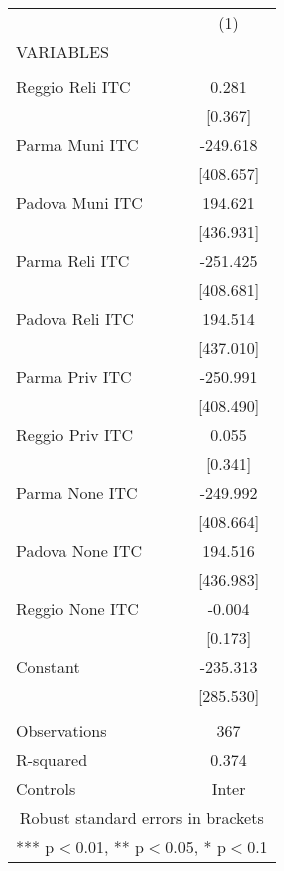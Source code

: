 \begin{tabular}{lc} \hline
 & (1) \\
VARIABLES &  \\ \hline
 &  \\
Reggio Reli ITC & 0.281 \\
 & [0.367] \\
Parma Muni ITC & -249.618 \\
 & [408.657] \\
Padova Muni ITC & 194.621 \\
 & [436.931] \\
Parma Reli ITC & -251.425 \\
 & [408.681] \\
Padova Reli ITC & 194.514 \\
 & [437.010] \\
Parma Priv ITC & -250.991 \\
 & [408.490] \\
Reggio Priv ITC & 0.055 \\
 & [0.341] \\
Parma None ITC & -249.992 \\
 & [408.664] \\
Padova None ITC & 194.516 \\
 & [436.983] \\
Reggio None ITC & -0.004 \\
 & [0.173] \\
Constant & -235.313 \\
 & [285.530] \\
 &  \\
Observations & 367 \\
R-squared & 0.374 \\
 Controls & Inter \\ \hline
\multicolumn{2}{c}{ Robust standard errors in brackets} \\
\multicolumn{2}{c}{ *** p$<$0.01, ** p$<$0.05, * p$<$0.1} \\
\end{tabular}
